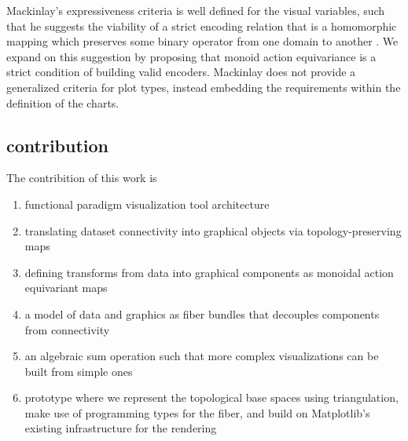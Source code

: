 \documentclass[../main.tex]{subfiles}
\begin{document}
Mackinlay's expressiveness criteria is well defined for the visual variables, such that he suggests the viability of a strict encoding relation that is a homomorphic mapping which preserves some binary operator from one domain to another \cite{mackinlayAUTOMATICDESIGNGRAPHICAL1987}. We expand on this suggestion by proposing that monoid action equivariance is a strict condition of building valid encoders. Mackinlay does not provide a generalized criteria for plot types, instead embedding the requirements within the definition of the charts. 





\subsection{contribution}
The contribition of this work is 

\begin{enumerate}
    \item functional paradigm visualization tool architecture
    \item translating dataset connectivity into graphical objects via topology-preserving maps
    \item defining transforms from data into graphical components as monoidal action equivariant maps
    \item a model of data and graphics as fiber bundles that decouples components from connectivity
    \item an algebraic sum operation such that more complex visualizations can be built from simple ones 
    \item prototype where we represent the topological base spaces using triangulation, make use of programming types for the fiber, and build on Matplotlib's existing infrastructure for the rendering 
\end{enumerate}
\end{document}
